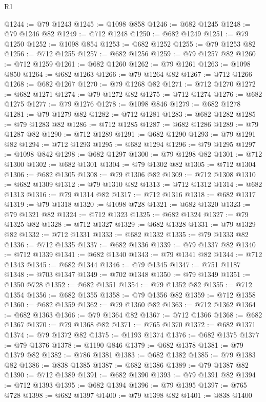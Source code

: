 \begin{lexlean}{R1}
\begin{coremodule}
{{{{{{{{{{{{{{{{{{{{{{{{{{{{{{{{{{{{{{{{{{{{{{{{{{@1244 := @79 @1243
@1245 := @1098 @858
@1246 := @682 @1245
@1248 := @79 @1246 @82
@1249 := @712 @1248
@1250 := @682 @1249
@1251 := @79 @1250
@1252 := @1098 @854
@1253 := @682 @1252
@1255 := @79 @1253 @82
@1256 := @712 @1255
@1257 := @682 @1256
@1259 := @79 @1257 @82
@1260 := @712 @1259
@1261 := @682 @1260
@1262 := @79 @1261
@1263 := @1098 @850
@1264 := @682 @1263
@1266 := @79 @1264 @82
@1267 := @712 @1266
@1268 := @682 @1267
@1270 := @79 @1268 @82
@1271 := @712 @1270
@1272 := @682 @1271
@1274 := @79 @1272 @82
@1275 := @712 @1274
@1276 := @682 @1275
@1277 := @79 @1276
@1278 := @1098 @846
@1279 := @682 @1278
@1281 := @79 @1279 @82
@1282 := @712 @1281
@1283 := @682 @1282
@1285 := @79 @1283 @82
@1286 := @712 @1285
@1287 := @682 @1286
@1289 := @79 @1287 @82
@1290 := @712 @1289
@1291 := @682 @1290
@1293 := @79 @1291 @82
@1294 := @712 @1293
@1295 := @682 @1294
@1296 := @79 @1295
@1297 := @1098 @842
@1298 := @682 @1297
@1300 := @79 @1298 @82
@1301 := @712 @1300
@1302 := @682 @1301
@1304 := @79 @1302 @82
@1305 := @712 @1304
@1306 := @682 @1305
@1308 := @79 @1306 @82
@1309 := @712 @1308
@1310 := @682 @1309
@1312 := @79 @1310 @82
@1313 := @712 @1312
@1314 := @682 @1313
@1316 := @79 @1314 @82
@1317 := @712 @1316
@1318 := @682 @1317
@1319 := @79 @1318
@1320 := @1098 @728
@1321 := @682 @1320
@1323 := @79 @1321 @82
@1324 := @712 @1323
@1325 := @682 @1324
@1327 := @79 @1325 @82
@1328 := @712 @1327
@1329 := @682 @1328
@1331 := @79 @1329 @82
@1332 := @712 @1331
@1333 := @682 @1332
@1335 := @79 @1333 @82
@1336 := @712 @1335
@1337 := @682 @1336
@1339 := @79 @1337 @82
@1340 := @712 @1339
@1341 := @682 @1340
@1343 := @79 @1341 @82
@1344 := @712 @1343
@1345 := @682 @1344
@1346 := @79 @1345
@1347 := @751 @1187
@1348 := @703 @1347
@1349 := @702 @1348
@1350 := @79 @1349
@1351 := @1350 @728
@1352 := @682 @1351
@1354 := @79 @1352 @82
@1355 := @712 @1354
@1356 := @682 @1355
@1358 := @79 @1356 @82
@1359 := @712 @1358
@1360 := @682 @1359
@1362 := @79 @1360 @82
@1363 := @712 @1362
@1364 := @682 @1363
@1366 := @79 @1364 @82
@1367 := @712 @1366
@1368 := @682 @1367
@1370 := @79 @1368 @82
@1371 := @765 @1370
@1372 := @682 @1371
@1374 := @79 @1372 @82
@1375 := @1193 @1374
@1376 := @682 @1375
@1377 := @79 @1376
@1378 := @1190 @846
@1379 := @682 @1378
@1381 := @79 @1379 @82
@1382 := @786 @1381
@1383 := @682 @1382
@1385 := @79 @1383 @82
@1386 := @838 @1385
@1387 := @682 @1386
@1389 := @79 @1387 @82
@1390 := @712 @1389
@1391 := @682 @1390
@1393 := @79 @1391 @82
@1394 := @712 @1393
@1395 := @682 @1394
@1396 := @79 @1395
@1397 := @765 @728
@1398 := @682 @1397
@1400 := @79 @1398 @82
@1401 := @838 @1400
}}}}}}}}}}}}}}}}}}}}}}}}}}}}}}}}}}}}}}}}}}}}}}}}}}
\end{coremodule}
\end{lexlean}
